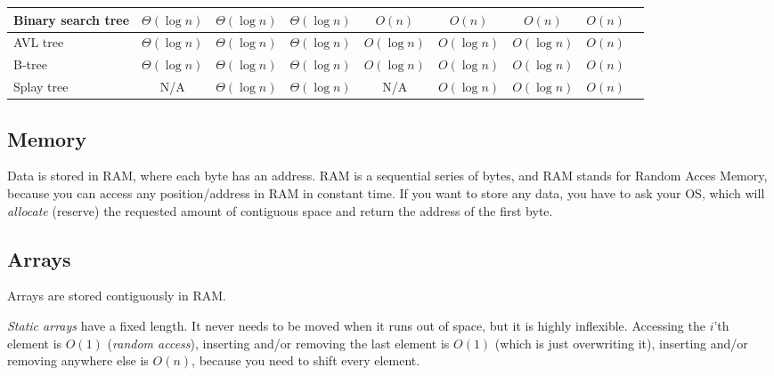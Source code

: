 \documentclass[8pt, table, xcdraw]{article}%
\begin{document}
\begin{table}[htbp!]
{\begin{tabular}{|l|c|c|c|c|c|c|c|c|}
    Binary search tree & {\cellcolor{yellowgreen!30}$\Theta(\log n)$} & {\cellcolor{yellowgreen!30}$\Theta(\log n)$} & {\cellcolor{yellowgreen!30}$\Theta(\log n)$} & {\cellcolor{yellow!30}$O(n)$} & {\cellcolor{yellow!30}$O(n)$} & {\cellcolor{yellow!30}$O(n)$} & {\cellcolor{yellow!30}$O(n)$} \\ \hline
    AVL tree & {\cellcolor{yellowgreen!30}$\Theta(\log n)$} & {\cellcolor{yellowgreen!30}$\Theta(\log n)$} & {\cellcolor{yellowgreen!30}$\Theta(\log n)$} & {\cellcolor{yellowgreen!30}$O(\log n)$} & {\cellcolor{yellowgreen!30}$O(\log n)$} & {\cellcolor{yellowgreen!30}$O(\log n)$} & {\cellcolor{yellow!30}$O(n)$} \\ \hline
    B-tree & {\cellcolor{yellowgreen!30}$\Theta(\log n)$} & {\cellcolor{yellowgreen!30}$\Theta(\log n)$} & {\cellcolor{yellowgreen!30}$\Theta(\log n)$} & {\cellcolor{yellowgreen!30}$O(\log n)$} & {\cellcolor{yellowgreen!30}$O(\log n)$} & {\cellcolor{yellowgreen!30}$O(\log n)$} & {\cellcolor{yellow!30}$O(n)$} \\ \hline
    Splay tree & {\cellcolor{gray!30}N/A} & {\cellcolor{yellowgreen!30}$\Theta(\log n)$} & {\cellcolor{yellowgreen!30}$\Theta(\log n)$} & {\cellcolor{gray!30}N/A} & {\cellcolor{yellowgreen!30}$O(\log n)$} & {\cellcolor{yellowgreen!30}$O(\log n)$} & {\cellcolor{yellow!30}$O(n)$} \\ \hline
    \end{tabular}
    }
\end{table}

\subsection{Memory}

Data is stored in RAM, where each byte has an address. RAM is a sequential series of bytes, and RAM stands for Random Acces Memory, because you can access any position/address in RAM in constant time. If you want to store any data, you have to ask your OS, which will \emph{allocate} (reserve) the requested amount of contiguous space and return the address of the first byte.

\subsection{Arrays}

Arrays are stored contiguously in RAM.

\emph{Static arrays} have a fixed length. It never needs to be moved when it runs out of space, but it is highly inflexible. Accessing the $i$'th element is $O(1)$ (\emph{random access}), inserting and/or removing the last element is $O(1)$ (which is just overwriting it), inserting and/or removing anywhere else is $O(n)$, because you need to shift every element.
\end{document}

